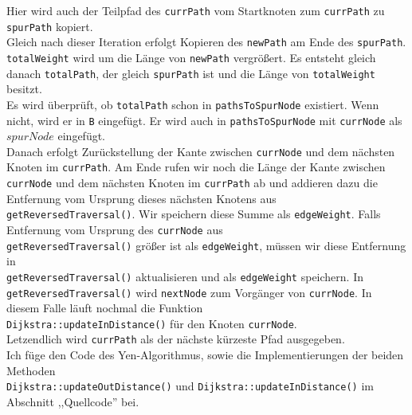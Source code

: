 \documentclass[a4paper,10pt,ngerman]{scrartcl}
\begin{document}
Hier wird auch der Teilpfad des \texttt{currPath} vom Startknoten zum \texttt{currPath} zu \texttt{spurPath} kopiert.\\
Gleich nach dieser Iteration erfolgt Kopieren des \texttt{newPath} am Ende des \texttt{spurPath}.
\texttt{totalWeight} wird um die Länge von \texttt{newPath} vergrößert.
Es entsteht gleich danach \texttt{totalPath}, der gleich \texttt{spurPath} ist und die Länge von \texttt{totalWeight} besitzt.\\
Es wird überprüft, ob \texttt{totalPath} schon in \texttt{pathsToSpurNode} existiert.
Wenn nicht, wird er in \texttt{B} eingefügt. Er wird auch in \texttt{pathsToSpurNode} mit
\texttt{currNode} als $spurNode$ eingefügt.\\
Danach erfolgt Zurückstellung der Kante zwischen \texttt{currNode} und dem nächsten Knoten im \texttt{currPath}.
Am Ende rufen wir noch die Länge der Kante zwischen \texttt{currNode} und dem nächsten Knoten im \texttt{currPath} ab
und addieren dazu die Entfernung vom Ursprung dieses nächsten Knotens aus \texttt{getReversedTraversal()}.
Wir speichern diese Summe als \texttt{edgeWeight}.
Falls Entfernung vom Ursprung des \texttt{currNode} aus \\ \texttt{getReversedTraversal()} größer ist als \texttt{edgeWeight},
müssen wir diese Entfernung in\\ \texttt{getReversedTraversal()} aktualisieren und als \texttt{edgeWeight} speichern.
In \texttt{getReversedTraversal()} wird \texttt{nextNode} zum Vorgänger von \texttt{currNode}.
In diesem Falle läuft nochmal die Funktion\\ \texttt{Dijkstra::updateInDistance()} für den Knoten \texttt{currNode}.\\
Letzendlich wird \texttt{currPath} als der nächste kürzeste Pfad ausgegeben.\\

Ich füge den Code des Yen-Algorithmus, sowie die Implementierungen der beiden Methoden\\
\texttt{Dijkstra::updateOutDistance()} und \texttt{Dijkstra::updateInDistance()} im Abschnitt ,,Quellcode'' bei.


\newpage
\end{document}
